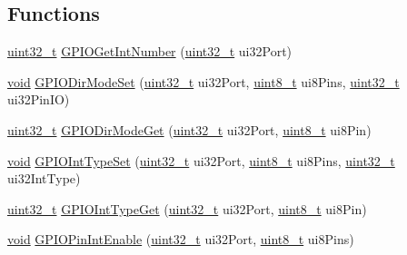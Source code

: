 \subsection*{Functions}
\begin{DoxyCompactItemize}
\item 
\hyperlink{_p_e___types_8h_a33594304e786b158f3fb30289278f5af}{uint32\+\_\+t} \hyperlink{group__gpio__api_ga0c72ea37e36a26a982bfe2587fc2ce40}{G\+P\+I\+O\+Get\+Int\+Number} (\hyperlink{_p_e___types_8h_a33594304e786b158f3fb30289278f5af}{uint32\+\_\+t} ui32\+Port)
\item 
\hyperlink{usb__devapi_8h_afabf60e7f57651d6d595a02c75f07cd0}{void} \hyperlink{group__gpio__api_ga18dc54943796485c7298abd8fdcdcec3}{G\+P\+I\+O\+Dir\+Mode\+Set} (\hyperlink{_p_e___types_8h_a33594304e786b158f3fb30289278f5af}{uint32\+\_\+t} ui32\+Port, \hyperlink{_p_e___types_8h_aba7bc1797add20fe3efdf37ced1182c5}{uint8\+\_\+t} ui8\+Pins, \hyperlink{_p_e___types_8h_a33594304e786b158f3fb30289278f5af}{uint32\+\_\+t} ui32\+Pin\+IO)
\item 
\hyperlink{_p_e___types_8h_a33594304e786b158f3fb30289278f5af}{uint32\+\_\+t} \hyperlink{group__gpio__api_ga6f2d57e3e4d64c9ecbebc8cc4db2b3e1}{G\+P\+I\+O\+Dir\+Mode\+Get} (\hyperlink{_p_e___types_8h_a33594304e786b158f3fb30289278f5af}{uint32\+\_\+t} ui32\+Port, \hyperlink{_p_e___types_8h_aba7bc1797add20fe3efdf37ced1182c5}{uint8\+\_\+t} ui8\+Pin)
\item 
\hyperlink{usb__devapi_8h_afabf60e7f57651d6d595a02c75f07cd0}{void} \hyperlink{group__gpio__api_gad98083fe7f4ce6c4e7daf004768dec1d}{G\+P\+I\+O\+Int\+Type\+Set} (\hyperlink{_p_e___types_8h_a33594304e786b158f3fb30289278f5af}{uint32\+\_\+t} ui32\+Port, \hyperlink{_p_e___types_8h_aba7bc1797add20fe3efdf37ced1182c5}{uint8\+\_\+t} ui8\+Pins, \hyperlink{_p_e___types_8h_a33594304e786b158f3fb30289278f5af}{uint32\+\_\+t} ui32\+Int\+Type)
\item 
\hyperlink{_p_e___types_8h_a33594304e786b158f3fb30289278f5af}{uint32\+\_\+t} \hyperlink{group__gpio__api_gab18d79b27894a1cfb22a1cf21061934a}{G\+P\+I\+O\+Int\+Type\+Get} (\hyperlink{_p_e___types_8h_a33594304e786b158f3fb30289278f5af}{uint32\+\_\+t} ui32\+Port, \hyperlink{_p_e___types_8h_aba7bc1797add20fe3efdf37ced1182c5}{uint8\+\_\+t} ui8\+Pin)
\item 
\hyperlink{usb__devapi_8h_afabf60e7f57651d6d595a02c75f07cd0}{void} \hyperlink{group__gpio__api_ga832dcfabffa2c2f81d8c9e0fc7a8eddb}{G\+P\+I\+O\+Pin\+Int\+Enable} (\hyperlink{_p_e___types_8h_a33594304e786b158f3fb30289278f5af}{uint32\+\_\+t} ui32\+Port, \hyperlink{_p_e___types_8h_aba7bc1797add20fe3efdf37ced1182c5}{uint8\+\_\+t} ui8\+Pins)

\end{DoxyCompactItemize}
